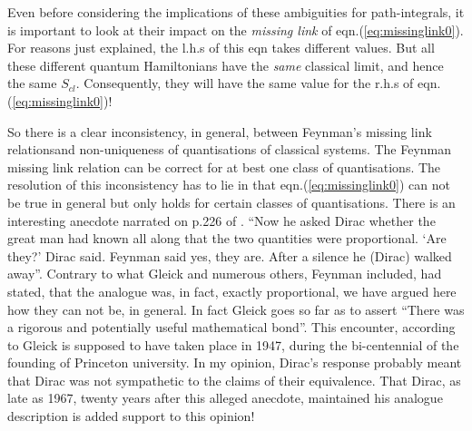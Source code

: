 \documentclass[12pt]{article}
\newcommand{\be}{\begin{equation}}
\newcommand{\ee}{\end{equation}}
\begin{document}
Even before considering the implications of these ambiguities for path-integrals, it is important to look at their impact on the \emph{missing link} of eqn.(\ref{eq:missinglink0}). For reasons just explained, the l.h.s of this eqn  takes different values. But all these different
quantum Hamiltonians have the \emph{same} classical limit, and hence the same $S_{cl}$. Consequently, they will have the same value for
the r.h.s of eqn.(\ref{eq:missinglink0})! 

So there is a clear inconsistency, in general, between Feynman's  missing link relationsand non-uniqueness of quantisations of classical 
systems. 
The Feynman missing link relation can be correct for at best one class of quantisations. 
The resolution of this inconsistency has to lie in that eqn.(\ref{eq:missinglink0}) can not be true in general but only holds for certain 
classes of quantisations.  There is an interesting anecdote narrated on p.226 of \cite{gleick}. ``Now he asked Dirac whether the great man 
had known all along that the
two quantities were proportional. `Are they?' Dirac said. Feynman said yes, they are. After a silence he (Dirac) walked away''. Contrary to
what Gleick and numerous others, Feynman included, had stated, that the analogue was, in fact, exactly proportional, we have argued here 
how they can not be, in general. In fact Gleick goes so far as to assert ``There was a rigorous and potentially useful mathematical bond''.
This encounter, according to Gleick is supposed to have taken place in 1947, during the bi-centennial of the founding of Princeton university.
In my opinion, Dirac's response probably meant that Dirac was not sympathetic to the claims of their equivalence. That Dirac, as late as 1967,
twenty years after this alleged anecdote, maintained his analogue description \cite{diracbook4r} is added support to this opinion!
\end{document}
